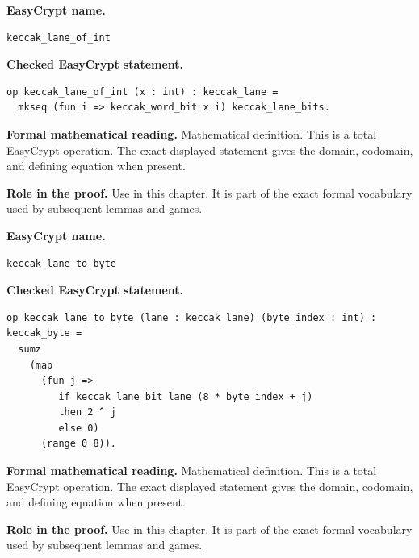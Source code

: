 \begin{formaldefinition}
\noindent\textbf{EasyCrypt name.}
\begin{lstlisting}[language=EasyCrypt,basicstyle=\ttfamily\scriptsize]
keccak_lane_of_int
\end{lstlisting}
\noindent\textbf{Checked EasyCrypt statement.}
\begin{lstlisting}[language=EasyCrypt,basicstyle=\ttfamily\scriptsize]
op keccak_lane_of_int (x : int) : keccak_lane =
  mkseq (fun i => keccak_word_bit x i) keccak_lane_bits.
\end{lstlisting}
\noindent\textbf{Formal mathematical reading.}
Mathematical definition. This is a total EasyCrypt operation.  The exact displayed statement gives the domain, codomain, and defining equation when present.

\noindent\textbf{Role in the proof.}
Use in this chapter. It is part of the exact formal vocabulary used by subsequent lemmas and games.

\end{formaldefinition}

\begin{formaldefinition}
\noindent\textbf{EasyCrypt name.}
\begin{lstlisting}[language=EasyCrypt,basicstyle=\ttfamily\scriptsize]
keccak_lane_to_byte
\end{lstlisting}
\noindent\textbf{Checked EasyCrypt statement.}
\begin{lstlisting}[language=EasyCrypt,basicstyle=\ttfamily\scriptsize]
op keccak_lane_to_byte (lane : keccak_lane) (byte_index : int) : keccak_byte =
  sumz
    (map
      (fun j =>
         if keccak_lane_bit lane (8 * byte_index + j)
         then 2 ^ j
         else 0)
      (range 0 8)).
\end{lstlisting}
\noindent\textbf{Formal mathematical reading.}
Mathematical definition. This is a total EasyCrypt operation.  The exact displayed statement gives the domain, codomain, and defining equation when present.

\noindent\textbf{Role in the proof.}
Use in this chapter. It is part of the exact formal vocabulary used by subsequent lemmas and games.

\end{formaldefinition}


